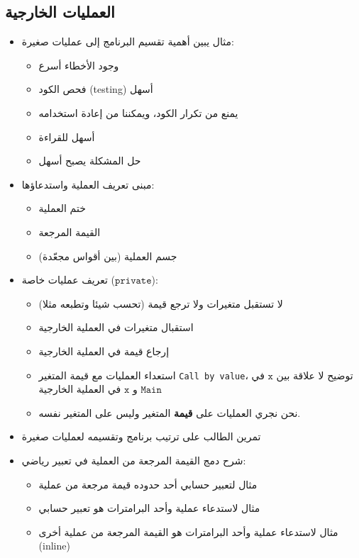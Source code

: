﻿\documentclass[14pt]{extarticle}
\begin{document}
\subsection{العمليات الخارجية}


\begin{itemize}
    \item مثال يبين أهمية تقسيم البرنامج إلى عمليات صغيرة:
    \begin{itemize}
        \item وجود الأخطاء أسرع
        \item فحص الكود (testing) أسهل
        \item يمنع من تكرار الكود، ويمكننا من إعادة استخدامه
        \item أسهل للقراءة
        \item حل المشكلة يصبح أسهل
    \end{itemize}
    \item مبنى تعريف العملية واستدعاؤها:
    \begin{itemize}
        \item ختم العملية
        \item القيمة المرجعة
        \item جسم العملية (بين أقواس  مجعّدة)
    \end{itemize}
    \item تعريف عمليات خاصة ($\mathtt{private}$):
    \begin{itemize}
        \item لا تستقبل متغيرات ولا ترجع قيمة (تحسب شيئا وتطبعه مثلا)
        \item استقبال متغيرات في العملية الخارجية
        \item إرجاع قيمة في العملية الخارجية
        \item استعداء العمليات مع قيمة المتغير \textenglish{\texttt{Call by value}}، توضيح لا علاقة بين $\mathtt{x}$ في $\mathtt{Main}$ و $\mathtt{x}$ في العملية الخارجية
        \item نحن نجري العمليات على \textbf{قيمة} المتغير وليس على المتغير نفسه.
    \end{itemize}
    \item تمرين الطالب على ترتيب برنامج وتقسيمه لعمليات صغيرة
    \item شرح دمج القيمة المرجعة من العملية في تعبير رياضي:
    \begin{itemize}
        \item مثال لتعبير حسابي أحد حدوده قيمة مرجعة من عملية
        \item مثال لاستدعاء عملية وأحد البرامترات هو تعبير حسابي
        \item مثال لاستدعاء عملية وأحد البرامترات هو القيمة المرجعة من عملية أخرى (inline)
    \end{itemize}
\end{itemize}
\end{document}
